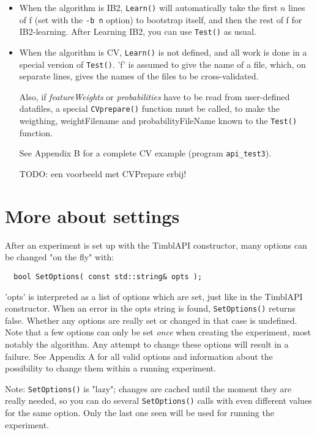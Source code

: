 \documentclass{report}
\begin{document}
\begin{itemize}
\item When the algorithm is IB2, {\tt Learn()} will automatically take
  the first $n$ lines of f (set with the {\tt -b n} option) to
  bootstrap itself, and then the rest of f for IB2-learning. After
  Learning IB2, you can use {\tt Test()} as usual.

\item When the algorithm is CV, {\tt Learn()} is not defined, and all
  work is done in a special version of {\tt Test()}. 'f' is assumed to
  give the name of a file, which, on separate lines, gives the names
  of the files to be cross-validated.

  Also, if {\em featureWeights} or {\em probabilities} have to be read from 
  user-defined datafiles, a special {\tt CVprepare()} function must be called, 
  to make the weigthing, weightFilename and probabilityFileName known to the 
{\tt Test()} function.

See Appendix B for a complete CV example (program {\tt api\_test3}).

TODO: een voorbeeld met CVPrepare erbij!

\end{itemize}

\section{More about settings}

After an experiment is set up with the TimblAPI constructor, many
options can be changed "on the fly" with:

\begin{footnotesize}
\begin{verbatim}
  bool SetOptions( const std::string& opts );
\end{verbatim}
\end{footnotesize}

'opts' is interpreted as a list of options which are set, just like in
the TimblAPI constructor. When an error in the opts string is found,
{\tt SetOptions()} returns false. Whether any options are really set
or changed in that case is undefined. Note that a few options can only
be set {\em once}\/ when creating the experiment, most notably the
algorithm. Any attempt to change these options will result in a
failure.  See Appendix A for all valid options and information about
the possibility to change them within a running experiment.

Note: {\tt SetOptions()} is "lazy"; changes are cached until the
moment they are really needed, so you can do several {\tt SetOptions()}
calls with even different values for the same option. Only the last
one seen will be used for running the experiment.
\end{document}
